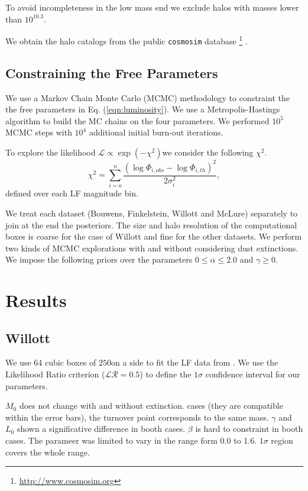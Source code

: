 \documentclass{emulateapj}
\newcommand{\hMpc}{{\ifmmode{h^{-1}{\rm Mpc}}\else{$h^{-1}$Mpc }\fi}}
\newcommand{\hMsun}{{\ifmmode{h^{-1}{\rm
        {M_{\odot}}}}\else{$h^{-1}{\rm{M_{\odot}}}$}\fi}}
\begin{document}
To avoid incompleteness in the low mass end we exclude halos with
masses lower than $10^{10.3}$\hMsun.



We obtain the halo catalogs from the public \texttt{cosmosim}
database \footnote{\url{http://www.cosmosim.org}} \citep{Riebe13}.   



\subsection{Constraining the Free Parameters}


We use a Markov Chain Monte Carlo (MCMC) methodology to constraint the 
the free parameters in Eq. (\ref{eqn:luminosity}). 
We use a Metropolis-Hastings algorithm to build the MC chains on the
four parameters. 
We performed $10^5$ MCMC steps with $10^4$ additional initial burn-out
iterations.


To explore the likelihood ${\mathcal L}\propto \exp{(-\chi^2)}$we
consider the following $\chi^2$. 
\begin{equation} 
\chi^2  = \sum_{i=o}^{n} \frac {\left( \log\Phi_{i,obs} - \log\Phi_{i,th} \right)^2
}{2\sigma_i^2}, 
\end{equation}
defined over each LF magnitude bin.

We treat each dataset (Bouwens, Finkelstein, Willott and McLure)
separately to join at the end the posteriors. 
The size and halo resolution of the computational boxes is coarse for
the case of Willott and fine for the other datasets.
We perform two kinds of MCMC explorations with and without considering
dust extinctions.
We impose the following priors over the parameters $0 \leq \alpha \leq
2.0 $  and  $\gamma \geq 0$. 
 

\section{Results}
\label{sec:results}

\subsection{Willott}

We use 64 cubic boxes of $250$\hMpc on a side to fit the
LF data from \citet{Willott13}.
We use the Likelihood Ratio criterion ($\mathcal{LR}= 0.5$) to
define the $1\sigma$ confidence interval for our parameters.

$M_0$ does not change with and without extinction.
cases (they are compatible within 
the error bars), the turnover point corresponds to the same mass.
$\gamma$ and $L_0$ shown a significative difference in booth cases.
$\beta$ is hard to constraint in booth cases.  
The parameer was limited to vary in the range form 0.0 to 1.6. 
$1\sigma$ region covers the whole range.
\end{document}
